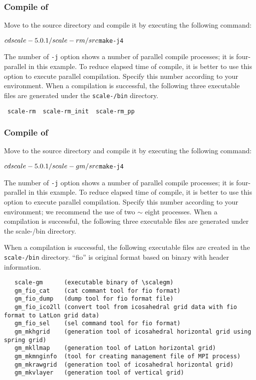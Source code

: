 \subsubsection{Compile of \scalerm} %

Move to the \scalerm source directory
and compile it by executing the following command:
\begin{alltt}
 $ cd scale-{\version}/scale-rm/src
 $ make -j 4
\end{alltt}
The number of \verb|-j| option shows a number of parallel compile processes;
it is four-parallel in this example.
To reduce elapsed time of compile,
it is better to use this option to execute parallel compilation.
Specify this number according to your environment.
When a compilation is successful,
the following three executable files are generated under the \texttt{scale-{\version}/bin} directory.
\begin{verbatim}
 scale-rm  scale-rm_init  scale-rm_pp
\end{verbatim}


\subsubsection{Compile of \scalegm} %

Move to the \scalegm source directory
and compile it by executing the following command:
\begin{alltt}
  $  cd scale-{\version}/scale-gm/src
  $  make -j 4
\end{alltt}

The number of \verb|-j| option shows a number of parallel compile processes;
it is four-parallel in this example.
To reduce elapsed time of compile,
it is better to use this option to execute parallel compilation.
Specify this number according to your environment;
we recommend the use of two $\sim$ eight processes.
When a compilation is successful,
the following three executable files are generated under the scale-{\version}/bin directory.

When a compilation is successful,
the following executable files are created in the \texttt{scale-{\version}/bin} directory.
``fio'' is original format based on binary with header information.
\begin{verbatim}
   scale-gm      (executable binary of \scalegm)
   gm_fio_cat    (cat commant tool for fio format)
   gm_fio_dump   (dump tool for fio format file)
   gm_fio_ico2ll (convert tool from icosahedral grid data with fio format to LatLon grid data)
   gm_fio_sel    (sel command tool for fio format)
   gm_mkhgrid    (generation tool of icosahedral horizontal grid using spring grid)
   gm_mkllmap    (generation tool of LatLon horizontal grid)
   gm_mkmnginfo  (tool for creating management file of MPI process)
   gm_mkrawgrid  (generation tool of icosahedral horizontal grid)
   gm_mkvlayer   (generation tool of vertical grid)
\end{verbatim}


